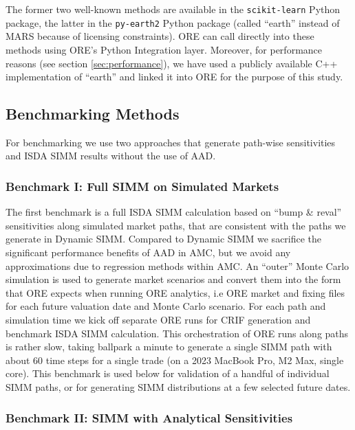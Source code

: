 \documentclass[11pt,a4paper,oneside]{article}
\begin{document}
The former two well-known methods are available in the {\tt scikit-learn} Python package, the latter in the {\tt py-earth2} Python package
(called ``earth'' instead of MARS because of licensing constraints). ORE can call directly into these methods using ORE's Python
Integration layer. Moreover, for performance reasons (see section \ref{sec:performance}), we have used a publicly available
C++ implementation of ``earth'' \cite{mars-rojas} and linked it into ORE for the purpose of this study.

\subsection{Benchmarking Methods}\label{sec:benchmarkingmethods}

For benchmarking we use two approaches that generate path-wise sensitivities and ISDA SIMM results without the use of AAD. 

\subsubsection*{Benchmark I: Full SIMM on Simulated Markets}

The first benchmark is a full ISDA SIMM calculation based on ``bump \& reval'' sensitivities
along si\-mu\-lated market paths, that are consistent with the paths we generate in Dynamic SIMM.
Compared to Dynamic SIMM we sacrifice the significant performance benefits of AAD in AMC, but we avoid any approximations
due to regression methods within AMC.
An ``outer'' Monte Carlo simulation is used to generate market scenarios and convert them into the form that ORE
expects when running ORE analytics, i.e ORE market and fixing files for each future valuation date and Monte Carlo
scenario. For each path and simulation time we kick off separate ORE runs for CRIF generation and
benchmark ISDA SIMM calculation. This orchestration of ORE runs along paths is rather slow, taking ballpark a minute to
generate a single SIMM path with about 60 time steps for a single trade  (on a 2023 MacBook Pro, M2 Max, single core).
This benchmark is used below for validation of a handful of individual SIMM paths, or for generating SIMM distributions
at a few selected future dates. %

\subsubsection*{Benchmark II: SIMM with Analytical Sensitivities}
\end{document}
